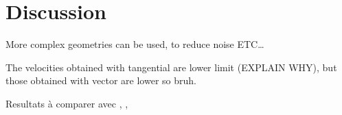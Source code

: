 \section{Discussion}
More complex geometries can be used, to reduce noise ETC\ldots \cite{burke_introduction_2013}

The velocities obtained with tangential are lower limit (EXPLAIN WHY), but those obtained with vector are lower so bruh.


Resultats à comparer avec \cite{ou_dark_2024}, \cite{jia_research_2022}, \cite{mroz_rotation_2019}